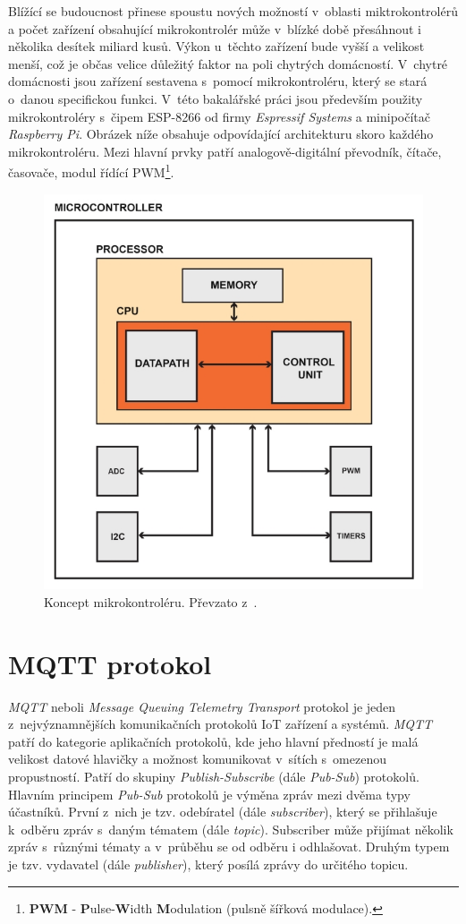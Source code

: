 Blížící se budoucnost přinese spoustu nových možností v~oblasti miktrokontrolérů a počet zařízení obsahující mikrokontrolér může v~blízké době přesáhnout i několika desítek miliard kusů.
Výkon u~těchto zařízení bude vyšší a velikost menší, což je občas velice důležitý faktor na poli chytrých domácností.
V~chytré domácnosti jsou zařízení sestavena s~pomocí mikrokontroléru, který se stará o~danou specifickou funkci.
V~této bakalářské práci jsou především použity mikrokontroléry s~čipem ESP-8266 od firmy \emph{Espressif Systems}
a minipočítač \emph{Raspberry Pi}. Obrázek níže obsahuje odpovídající architekturu skoro každého mikrokontroléru.
Mezi hlavní prvky patří analogově-digitální převodník, čítače, časovače, modul řídící PWM\footnote{\textbf{PWM} - \textbf{P}ulse-\textbf{W}idth \textbf{M}odulation (pulsně šířková modulace).}.

\begin{figure}[hbt]
  \centering
  \includegraphics[width=.6 \linewidth]{obrazky-figures/mcu.jpeg}
  \caption{
    Koncept mikrokontroléru. Převzato z~\cite{mcu:info}.
  }
  \label{figure:mcu}
\end{figure}

\newpage

\section{MQTT protokol}
\label{terminy:mqtt}

\emph{MQTT} neboli \emph{Message Queuing Telemetry Transport} protokol je jeden z~nejvýznamnějších komunikačních protokolů IoT zařízení a systémů.
\emph{MQTT} patří do kategorie aplikačních protokolů, kde jeho hlavní předností je malá velikost datové hlavičky a možnost komunikovat v~sítích s~omezenou propustností.
Patří do skupiny \emph{Publish-Subscribe} (dále \emph{Pub-Sub}) protokolů.
Hlavním principem \emph{Pub-Sub} protokolů je výměna zpráv mezi dvěma typy účastníků.
První z~nich je tzv. odebíratel (dále \emph{subscriber}),
který se přihlašuje k~odběru zpráv s~daným tématem (dále \emph{topic}).
Subscriber může přijímat několik zpráv s~různými tématy a v~průběhu se od odběru i odhlašovat.
Druhým typem je tzv. vydavatel (dále \emph{publisher}), který posílá zprávy do určitého
topicu.~\cite{mqtt:info}

